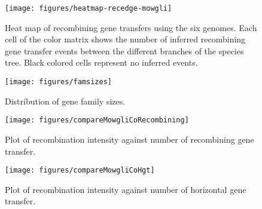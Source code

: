 \documentclass[10pt]{article}
\begin{document}
\begin{figure}
\begin{center}
\texttt{[image: figures/heatmap-recedge-mowgli]}
\end{center}
\caption{\label{fig:mowgli-recomb-heatmap}Heat map of recombining gene transfers using the
six genomes.
Each cell of the color matrix shows the number of inferred recombining
gene transfer events between the different branches of the species
tree. Black colored cells represent no inferred events.}
\end{figure}
\clearpage{}

\begin{figure}
\begin{center}
\texttt{[image: figures/famsizes]}
\end{center}
\caption{\label{fig:famsizes}Distribution of gene family sizes.}
\end{figure}
\clearpage{}

\begin{figure}
\begin{center}
\texttt{[image: figures/compareMowgliCoRecombining]}
\end{center}
\caption{\label{fig:cmpcomowgli}Plot of recombination intensity against number
of recombining gene transfer.}
\end{figure}
\clearpage{}

\begin{figure}
\begin{center}
\texttt{[image: figures/compareMowgliCoHgt]}
\end{center}
\caption{\label{fig:cmpcomowglihgt}Plot of recombination intensity against number
of horizontal gene transfer.}
\end{figure}
\clearpage{}
\end{document}

